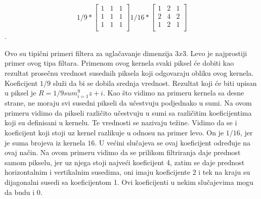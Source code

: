 \documentclass[a4paper,12pt,titlepage]{article}
\begin{document}
\[
1/9
*
\begin{bmatrix}
     1 & 1 & 1 \\
     1 & 1 & 1 \\
     1 & 1 & 1 \\
\end{bmatrix}
1/16
*
\begin{bmatrix}
     1 & 2 & 1 \\
     2 & 4 & 2 \\
     1 & 2 & 1 \\
\end{bmatrix}
\].   
  
Ovo su tipični primeri filtera za uglačavanje dimenzija $3 x 3$. Levo je najprostiji primer ovog tipa filtara. Primenom ovog kernela svaki piksel će dobiti kao rezultat prosečnu vrednost susednih piksela koji odgovaraju obliku ovog kernela. Koeficijent $1/9$ služi da bi se dobila srednja vrednost. Rezultat koji će biti upisan u piksel je $R = 1/9 sum_{i = 1}^{9} z+{i}$. Kao što vidimo na primeru kernela sa desne strane, ne moraju svi susedni pikseli da učestvuju podjednako u sumi. Na ovom primeru vidimo da pikseli različito učestvuju u sumi sa različitim koeficijentima koji su definisani u kernelu. Te vrednosti se nazivaju težine. Vidimo da se i koeficijent koji stoji uz kernel razlikuje u odnosu na primer levo. On je $1/16$, jer je suma brojeva iz kernela $16$. U većini slučajeva se ovaj koeficijent određuje na ovaj način. Na ovom primeru vidimo da se prilikom filtriranja daje prednost samom pikselu, jer uz njega stoji najveći koeficijent 4, zatim se daje prednost horizontalnim i vertikalnim susedima, oni imaju koeficijente 2 i tek na kraju su dijagonalni susedi sa koeficijentom 1. Ovi koeficijenti u nekim slučajevima mogu da budu i 0.
\end{document}
